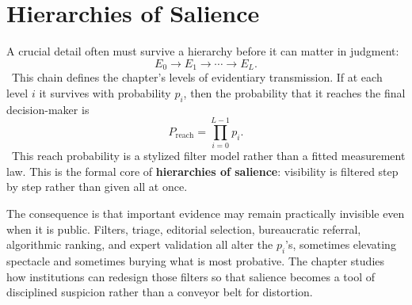 
\chapter{Hierarchies of Salience}
\label{ch:ch019}

A crucial detail often must survive a hierarchy before it can matter in judgment:
\[
E_0\to E_1\to \cdots\to E_L.
\]
\Definition\ This chain defines the chapter's levels of evidentiary transmission.
If at each level \(i\) it survives with probability \(p_i\), then the probability that it reaches the final decision-maker is
\[
P_{\mathrm{reach}}
=
\prod_{i=0}^{L-1}p_i.
\]
\ToyModel\ This reach probability is a stylized filter model rather than a fitted measurement law.
This is the formal core of \textbf{hierarchies of salience}: visibility is filtered step by step rather than given all at once.

The consequence is that important evidence may remain practically invisible even when it is public. Filters, triage, editorial selection, bureaucratic referral, algorithmic ranking, and expert validation all alter the \(p_i\)'s, sometimes elevating spectacle and sometimes burying what is most probative. The chapter studies how institutions can redesign those filters so that salience becomes a tool of disciplined suspicion rather than a conveyor belt for distortion.
